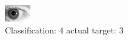 \begin{figure}[h!]
\begin{center}
\includegraphics[width=0.60\columnwidth]{figures/ID223_class_4_target_3.png}
\end{center}
\caption{ Classification: 4 actual target: 3}
\label{fig:ID223_class_4_target_3}
\end{figure}

